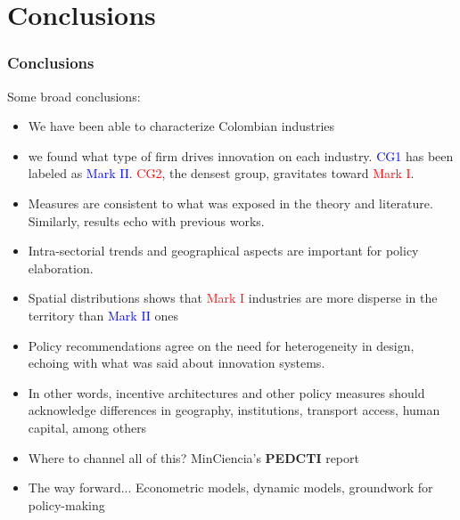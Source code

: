 \documentclass{beamer}
\begin{document}
\section{Conclusions}
	\begin{frame}[allowframebreaks]
		\frametitle{Conclusions}
		Some broad conclusions:
		\begin{itemize}
			\item We have been able to characterize Colombian industries
			\item we found what type of firm drives innovation on each industry. \textcolor{blue}{CG1} has been labeled as \textcolor{blue}{Mark II}. \textcolor{red}{CG2}, the densest group, gravitates toward \textcolor{red}{Mark I}.
			\item Measures are consistent to what was exposed in the theory and literature. Similarly, results echo with previous works.
			\item Intra-sectorial trends and geographical aspects are important for policy elaboration.
			\item Spatial distributions shows that \textcolor{red}{Mark I} industries are more disperse
			in the territory than \textcolor{blue}{Mark II} ones
		\pagebreak
			\item Policy recommendations agree on the need for heterogeneity in design, echoing with what was said about innovation systems.
			\item In other words, incentive architectures and other policy measures should acknowledge differences in geography, institutions, transport access, human capital, among others
			\item Where to channel all of this? MinCiencia's \textbf{PEDCTI} report
			\item The way forward... Econometric models, dynamic models, groundwork for policy-making
		\end{itemize}
	\end{frame}
\end{document}
